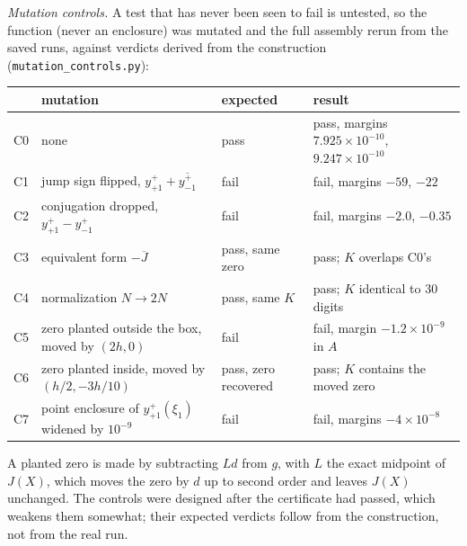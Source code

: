 \documentclass{amsart}
\numberwithin{equation}{section}
\theoremstyle{plain}
\theoremstyle{definition}
\theoremstyle{remark}
\newcommand{\repo}[1]{\texttt{#1}}
\begin{document}
\emph{Mutation controls.} A test that has never been seen to fail is untested, so the function (never an enclosure) was
mutated and the full assembly rerun from the saved runs, against verdicts derived from the construction
(\repo{mutation\_controls.py}):
\begin{center}\footnotesize
\begin{tabular}{llll}
\toprule
& mutation & expected & result \\
\midrule
C0 & none & pass & pass, margins $7.925\times10^{-10}$, $9.247\times10^{-10}$ \\
C1 & jump sign flipped, $y^+_{+1} + \overline{y^+_{-1}}$ & fail & fail, margins $-59$, $-22$ \\
C2 & conjugation dropped, $y^+_{+1} - y^+_{-1}$ & fail & fail, margins $-2.0$, $-0.35$ \\
C3 & equivalent form $-\overline{J}$ & pass, same zero & pass; $K$ overlaps C0's \\
C4 & normalization $N \to 2N$ & pass, same $K$ & pass; $K$ identical to 30 digits \\
C5 & zero planted outside the box, moved by $(2h, 0)$ & fail & fail, margin $-1.2\times10^{-9}$ in $A$ \\
C6 & zero planted inside, moved by $(h/2, -3h/10)$ & pass, zero recovered & pass; $K$ contains the moved zero \\
C7 & point enclosure of $y^+_{+1}(\xi_1)$ widened by $10^{-9}$ & fail & fail, margins $-4\times10^{-8}$ \\
\bottomrule
\end{tabular}
\end{center}
A planted zero is made by subtracting $Ld$ from $g$, with $L$ the exact midpoint of $J(X)$, which moves the zero by $d$ up to
second order and leaves $J(X)$ unchanged. The controls were designed after the certificate had passed, which weakens them
somewhat; their expected verdicts follow from the construction, not from the real run.
\end{document}
